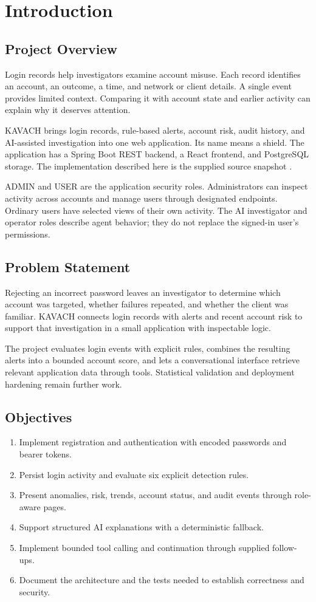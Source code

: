 \chapter{Introduction}
\section{Project Overview}
Login records help investigators examine account misuse. Each record identifies an account, an outcome, a time, and network or client details. A single event provides limited context. Comparing it with account state and earlier activity can explain why it deserves attention.

KAVACH brings login records, rule-based alerts, account risk, audit history, and AI-assisted investigation into one web application. Its name means a shield. The application has a Spring Boot REST backend, a React frontend, and PostgreSQL storage. The implementation described here is the supplied source snapshot \cite{repo}.

ADMIN and USER are the application security roles. Administrators can inspect activity across accounts and manage users through designated endpoints. Ordinary users have selected views of their own activity. The AI investigator and operator roles describe agent behavior; they do not replace the signed-in user's permissions.

\section{Problem Statement}
Rejecting an incorrect password leaves an investigator to determine which account was targeted, whether failures repeated, and whether the client was familiar. KAVACH connects login records with alerts and recent account risk to support that investigation in a small application with inspectable logic.

The project evaluates login events with explicit rules, combines the resulting alerts into a bounded account score, and lets a conversational interface retrieve relevant application data through tools. Statistical validation and deployment hardening remain further work.

\section{Objectives}
\begin{enumerate}
\item Implement registration and authentication with encoded passwords and bearer tokens.
\item Persist login activity and evaluate six explicit detection rules.
\item Present anomalies, risk, trends, account status, and audit events through role-aware pages.
\item Support structured AI explanations with a deterministic fallback.
\item Implement bounded tool calling and continuation through supplied follow-ups.
\item Document the architecture and the tests needed to establish correctness and security.
\end{enumerate}

